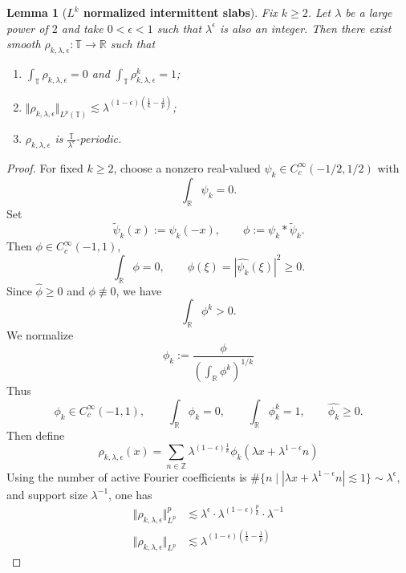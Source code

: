 \documentclass[12pt,reqno,letterpaper]{amsart}
\numberwithin{equation}{section}
\newcommand{\1}{{\bf 1}}
\newcommand{\2}{{\bf 2}}
\newcommand{\R}{\mathbb R}
\newcommand{\T}{\mathbb T}
\newcommand{\Z}{\mathbb Z}
\newcommand{\norm}[1]{ \Vert #1 \Vert}
\newtheorem{lemma}[theorem]{Lemma}
\theoremstyle{remark}
\theoremstyle{remark}
\begin{document}
\begin{lemma}[\textbf{$L^k$ normalized intermittent slabs}]\label{lem:boldW}
    Fix $k \geq 2$. Let $\lambda$ be a large power of $2$ and take $0 < \epsilon < 1$ such that $\lambda^{\epsilon}$ is also an integer. Then there exist smooth $\rho_{k,\lambda,\epsilon}:\T \to \R$ such that
    \begin{enumerate}
        \item\label{w:1} $\int_{\T} \rho_{k,\lambda,\epsilon} = 0$ and $\int_\T \rho_{k, \lambda, \epsilon}^k = 1$;
        \item\label{w:2} $\Vert \rho_{k,\lambda,\epsilon} \Vert_{L^p(\T)} \lesssim \lambda^{(1-\epsilon)\left(\frac{1}{k}-\frac{1}{p}\right)}$;
        \item\label{w:3} $\rho_{k,\lambda,\epsilon}$ is $\frac{\T}{\lambda^{\epsilon}}$-periodic.
    \end{enumerate}
\end{lemma}
\begin{proof}
For fixed $k\ge 2$, choose a nonzero real-valued $\psi_k \in C_c^\infty(-1/2,1/2)$ with 
\[
\int_{\R} \psi_k = 0.
\]
Set
\[
\widetilde\psi_k(x):=\psi_k(-x), \qquad \phi:=\psi_k \ast \widetilde\psi_k.
\]
Then $\phi\in C_c^\infty(-1,1)$,
\[
\int_{\R}\phi=0, \qquad \widehat\phi(\xi)=|\widehat{\psi_k}(\xi)|^2\ge0.
\]
Since $\widehat\phi\ge0$ and $\phi\not\equiv0$, we have
\[
\int_{\R}\phi^k >0.
\]
We normalize
\[
\phi_k:=\frac{\phi}{\left(\int_{\R}\phi^k\right)^{1/k}}
\]
Thus
\[
\phi_k\in C_c^\infty(-1,1), \qquad \int_{\R}\phi_k=0, \qquad \int_{\R}\phi_k^k=1, \qquad \widehat{\phi_k}\ge0.
\]
Then define 
    \begin{equation}\label{eq:rho}
        \rho_{k, \lambda, \epsilon}(x) = \sum_{n \in \Z} \lambda^{(1 - \epsilon)\frac{1}{k}}\phi_k(\lambda x+ \lambda^{1  - \epsilon} n)
    \end{equation}
    Using the number of active Fourier coefficients is $\#\{n \mid |\lambda x + \lambda^{1 - \epsilon}n| \lesssim 1\} \sim \lambda^{\epsilon}$, and support size $\lambda^{-1}$, one has 
    \begin{align*}
        \norm{\rho_{k, \lambda, \epsilon}}_{L^p}^p &\lesssim \lambda^{\epsilon} \cdot  \lambda^{(1 - \epsilon)\frac{p}{k}} \cdot \lambda^{-1} \\
         \norm{\rho_{k, \lambda, \epsilon}}_{L^p}&\lesssim  \lambda^{(1 - \epsilon)(\frac{1}{k} - \frac{1}{p})}
    \end{align*}
\end{proof}
\end{document}
